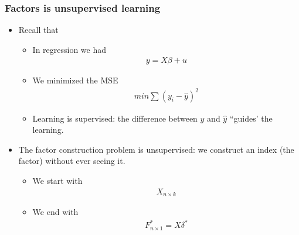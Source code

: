 \documentclass[
  shownotes,
  xcolor={svgnames},
  hyperref={colorlinks,citecolor=DarkBlue,linkcolor=DarkRed,urlcolor=DarkBlue}
  , aspectratio=169]{beamer}
\begin{document}
\begin{frame}
\frametitle{Factors is unsupervised learning}

\begin{itemize}

\item Recall that 
\begin{itemize}
  \item In regression we had
  \begin{align}
  y =X \beta +u
  \end{align}
 \item We minimized the MSE
 \begin{align}
 min \sum (y_i-\hat{y})^2
 \end{align}

\item Learning is supervised: the difference between $y$ and $\hat y$ ``guides' the learning.
\end{itemize}
\item  The factor construction problem is unsupervised: we construct an index (the factor) without ever seeing it.
\begin{itemize}
\item We start with 
\begin{align}
X_{n\times k}
\end{align}
\item We end  with 
\begin{align}
F^*_{n\times 1} = X\delta^*
\end{align}
\end{itemize}
\end{itemize}
\end{frame}
\end{document}
